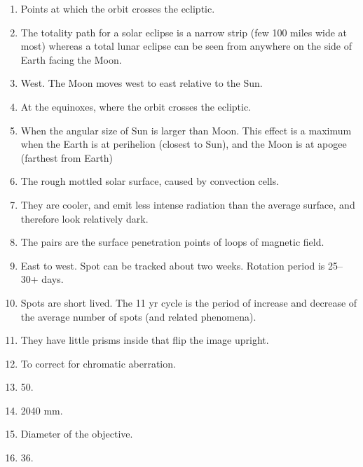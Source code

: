 \documentclass[11pt]{article}
\begin{document}
 
\bigskip
\begin{enumerate} 

\item
Points at which the orbit crosses the ecliptic.

\item 
The totality path for a solar eclipse is a narrow strip (few 100 miles
wide at most)
whereas a total lunar eclipse can be seen from anywhere on the
side of Earth facing the Moon.

\item 
West. The Moon moves west to east relative to the Sun.


\item 
At the equinoxes, where the orbit crosses the ecliptic.

\item 
When the angular size of Sun is larger than Moon. This effect is a maximum
when the Earth is at perihelion (closest to Sun), and the Moon is at 
apogee (farthest from Earth) 

\item 
The rough mottled solar surface, caused by convection cells.


\item 
They are cooler, and emit less intense radiation than the average
surface, and therefore look relatively dark.


\item 
The pairs are the surface penetration points of loops of magnetic field.

\item 
East to west. Spot can be tracked about two weeks. Rotation period is
25--30+ days.


\item 
Spots are short lived. The 11 yr cycle is the period of increase and
decrease of the average number of spots (and related phenomena).

\item 
They have little prisms inside that flip the image upright.

\item 
To correct for chromatic aberration.

\item 
50.

\item 
2040 mm.

\item 
Diameter of the objective.

\item 
36.


\end{enumerate}
\end{document}
